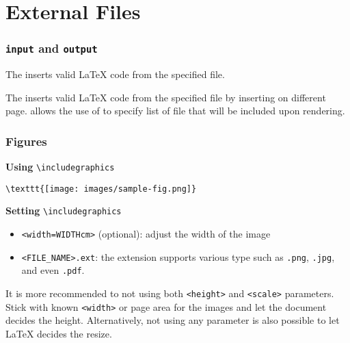 \documentclass{beamer}
\begin{document}
\section{External Files}

\begin{frame}[fragile]
  \frametitle{\texttt{input} and \texttt{output}}

  \verb||

  The \verb|| inserts valid LaTeX code from the specified file.

  \vspace{\baselineskip}

  \verb||

  The \verb|| inserts valid LaTeX code from the specified file by inserting on different page. \verb|| allows the use of \verb|| to specify list of file that will be included upon rendering.
\end{frame}

\begin{frame}[fragile]
  \frametitle{Figures}

  \textbf{Using} \verb|\includegraphics|

  \begin{block}{}
    \vspace{-2em}
    \small
    \begin{verbatim}
\texttt{[image: images/sample-fig.png]}
    \end{verbatim}
  \end{block}

  \textbf{Setting} \verb|\includegraphics|

  \begin{itemize}
    \item \verb|<width=WIDTHcm>| (optional): adjust the width of the image 
    \item \verb|<FILE_NAME>.ext|: the extension supports various type such as \texttt{.png}, \texttt{.jpg}, and even \texttt{.pdf}. 
  \end{itemize}

  It is more recommended to not using both \texttt{<height>} and \texttt{<scale>} parameters. Stick with known \texttt{<width>} or page area for the images and let the document decides the height. Alternatively, not using any parameter is also possible to let LaTeX decides the resize.

\end{frame}
\end{document}
